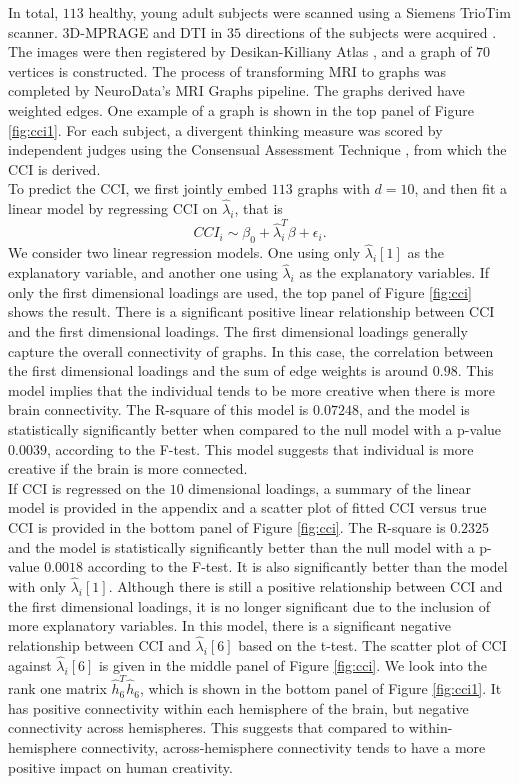 \documentclass[10pt,journal,compsoc]{IEEEtran}
\begin{document}
\noindent In total, $113$ healthy, young adult subjects were scanned using a Siemens TrioTim scanner. 3D-MPRAGE and DTI in $35$ directions of the subjects were acquired \cite{brant1992mp}. The images were then registered by Desikan-Killiany Atlas \cite{desikan2006automated}, and a graph of $70$ vertices is constructed. The process of transforming MRI to graphs was completed by NeuroData's MRI Graphs pipeline\cite{kiar2016ndmgcode}. The graphs derived have weighted edges. One example of a graph is shown in the top panel of Figure \ref{fig:cci1}. For each subject, a divergent thinking measure was scored by independent judges using the Consensual Assessment Technique \cite{amabile1983social}, from which the CCI is derived. \\

\noindent To predict the CCI, we first jointly embed $113$ graphs with $d=10$, and then fit a linear model by regressing CCI on $\hat{\lambda}_i$, that is
\[CCI_i \sim \beta_0+\hat{\lambda}_i^T\beta + \epsilon_i. \]
We consider two linear regression models. One using only $\hat{\lambda}_i[1]$ as the explanatory variable, and another one using $\hat{\lambda}_i$ as the explanatory variables. If only the first dimensional loadings are used, the top panel of Figure \ref{fig:cci} shows the result. There is a significant positive linear relationship between CCI and the first dimensional loadings. The first dimensional loadings generally capture the overall connectivity of graphs. In this case, the correlation between the first dimensional loadings and the sum of edge weights is around $0.98$. This model implies that the individual tends to be more creative when there is more brain connectivity. The R-square of this model is $0.07248$, and the model is statistically significantly better when compared to the null model with a p-value $0.0039$, according to the F-test. This model suggests that individual is more creative if the brain is more connected.\\

\noindent If CCI is regressed on the $10$ dimensional loadings, a summary of the linear model is provided in the appendix and a scatter plot of fitted CCI versus true CCI is provided in the bottom panel of Figure \ref{fig:cci}. The R-square is $0.2325$ and the model is statistically significantly better than the null model with a p-value $0.0018$ according to the F-test. It is also significantly better than the model with only $\hat{\lambda}_i[1]$. Although there is still a positive relationship between CCI and the first dimensional loadings, it is no longer significant due to the inclusion of more explanatory variables. In this model, there is a significant negative relationship between CCI and $\hat{\lambda}_i[6]$ based on the t-test. The scatter plot of CCI against $\hat{\lambda}_i[6]$ is given in the middle panel of Figure \ref{fig:cci}. We look into the rank one matrix $\hat{h}_6^T\hat{h}_6$, which is shown in the bottom panel of Figure \ref{fig:cci1}. It has positive connectivity within each hemisphere of the brain, but negative connectivity across hemispheres. This suggests that compared to within-hemisphere connectivity, across-hemisphere connectivity tends to have a more positive impact on human creativity. 
\end{document}
